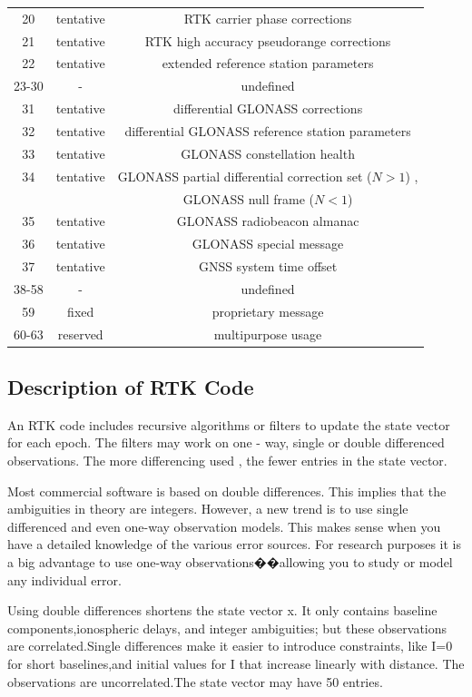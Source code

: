 \begin{table}[htbp]
\begin{tabular}{ccc}
		20& tentative &RTK carrier phase corrections\\
		21& tentative &RTK high accuracy pseudorange corrections\\
		22& tentative& extended reference station parameters\\
		23-30& -& undefined\\
		31& tentative &differential GLONASS corrections\\
		32 &tentative &differential GLONASS reference station parameters\\
		33 &tentative &GLONASS constellation health\\
		34& tentative& GLONASS partial differential correction set ($N > 1$) ,\\
		&&GLONASS null frame ($N < 1$)\\
		35& tentative &GLONASS radiobeacon almanac\\
		36& tentative& GLONASS special message\\
		37 &tentative& GNSS system time offset\\
		38-58&- &undefined\\
		59 &fixed &proprietary message\\
		60-63 &reserved& multipurpose usage\\
		\hline
	\end{tabular}
\end{table}

\subsection{Description of RTK Code}

An RTK code includes recursive algorithms or filters to update the state vector for each
epoch. The filters may work on one - way, single or double differenced observations. The
more differencing used , the fewer entries in the state vector.

Most commercial software is based on double differences. This implies that the ambiguities in theory are integers. However, a new trend is to use single differenced and even one-way observation models. This makes sense when you have a detailed knowledge of the various error sources. For research purposes it is a big advantage to use one-way observations��allowing you to study or model any individual error.

Using double differences shortens the state vector x. It only contains baseline components,ionospheric delays, and integer ambiguities; but these observations are correlated.Single differences make it easier to introduce constraints, like I=0 for short baselines,and initial values for I that increase linearly with distance. The observations are uncorrelated.The state vector may have 50 entries.

